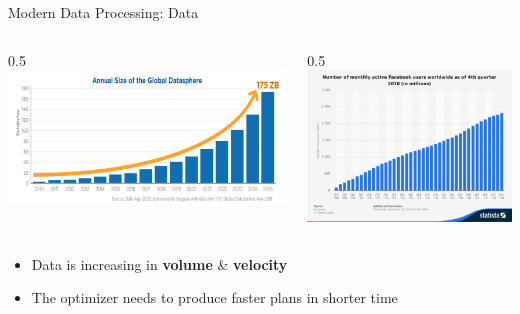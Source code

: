 \documentclass{beamer}
\begin{document}
  \begin{frame}{Modern Data Processing: Data}
    \begin{columns}
      \begin{column}{{0.5\textwidth}}
        \includegraphics[width=\linewidth]{datasphere.png}
      \end{column}
      \begin{column}{{0.5\textwidth}}
        \includegraphics[width=\linewidth]{fb.png}
      \end{column}
    \end{columns}
    \begin{itemize}
      \item Data is increasing in \textbf{volume} \& \textbf{velocity} \pause
      \item The optimizer needs to produce faster plans in shorter time
    \end{itemize}
  \end{frame}
\end{document}
